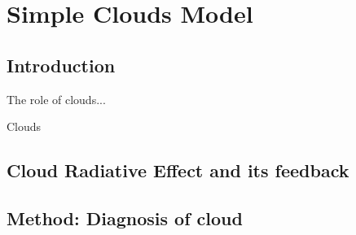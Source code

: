 
\chapter{Simple Clouds Model}  
\label{ch:chapter2}


\section{Introduction}
The role of clouds...

Clouds 

%  

\section{Cloud Radiative Effect and its feedback}


\section{Method: Diagnosis of cloud}

